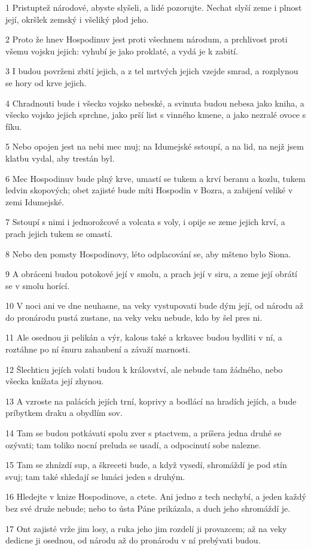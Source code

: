 \par 1 Pristuptež národové, abyste slyšeli, a lidé pozorujte. Nechat slyší zeme i plnost její, okršlek zemský i všeliký plod jeho.
\par 2 Proto že hnev Hospodinuv jest proti všechnem národum, a prchlivost proti všemu vojsku jejich: vyhubí je jako proklaté, a vydá je k zabití.
\par 3 I budou povrženi zbití jejich, a z tel mrtvých jejich vzejde smrad, a rozplynou se hory od krve jejich.
\par 4 Chradnouti bude i všecko vojsko nebeské, a svinuta budou nebesa jako kniha, a všecko vojsko jejich sprchne, jako prší list s vinného kmene, a jako nezralé ovoce s fíku.
\par 5 Nebo opojen jest na nebi mec muj; na Idumejské sstoupí, a na lid, na nejž jsem klatbu vydal, aby trestán byl.
\par 6 Mec Hospodinuv bude plný krve, umastí se tukem a krví beranu a kozlu, tukem ledvin skopových; obet zajisté bude míti Hospodin v Bozra, a zabijení veliké v zemi Idumejské.
\par 7 Sstoupí s nimi i jednorožcové a volcata s voly, i opije se zeme jejich krví, a prach jejich tukem se omastí.
\par 8 Nebo den pomsty Hospodinovy, léto odplacování se, aby mšteno bylo Siona.
\par 9 A obráceni budou potokové její v smolu, a prach její v siru, a zeme její obrátí se v smolu horící.
\par 10 V noci ani ve dne neuhasne, na veky vystupovati bude dým její, od národu až do pronárodu pustá zustane, na veky veku nebude, kdo by šel pres ni.
\par 11 Ale osednou ji pelikán a výr, kalous také a krkavec budou bydliti v ní, a roztáhne po ní šnuru zahanbení a závaží marnosti.
\par 12 Šlechticu jejích volati budou k království, ale nebude tam žádného, nebo všecka knížata její zhynou.
\par 13 A vzroste na palácích jejích trní, koprivy a bodlácí na hradích jejích, a bude príbytkem draku a obydlím sov.
\par 14 Tam se budou potkávati spolu zver s ptactvem, a príšera jedna druhé se ozývati; tam toliko nocní preluda se usadí, a odpocinutí sobe nalezne.
\par 15 Tam se zhnízdí sup, a škreceti bude, a když vysedí, shromáždí je pod stín svuj; tam také shledají se lunáci jeden s druhým.
\par 16 Hledejte v knize Hospodinove, a ctete. Ani jedno z tech nechybí, a jeden každý bez své druže nebude; nebo to ústa Páne prikázala, a duch jeho shromáždí je.
\par 17 Ont zajisté vrže jim losy, a ruka jeho jim rozdelí ji provazcem; až na veky dedicne ji osednou, od národu až do pronárodu v ní prebývati budou.

